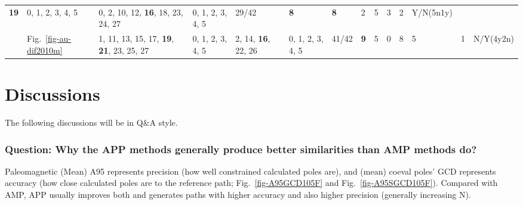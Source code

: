 \begin{table*}
{\begin{tabular}{l|l|l|l|l|l|l|l|l|l|l|l|l|l}
{{  \textbf{19}}} & \multirow{2}{*}{\parbox{1cm}{0, 1, 2, 3, 4, 5}} &
  \multirow{2}{*}{\parbox{2.4cm}{0, 2, 10, 12, \textbf{16}, 18, 23, 24, 27}} &
  \multirow{2}{*}{\parbox{1cm}{0, 1, 2, 3, 4, 5}} & 29/42 & \textbf{8} & \textbf{8} & 2 & 5 & 3
  & 2 & Y/N(5n1y) \\ \\ \cline{2-14}
& Fig.~\ref{fig-au-dif2010m} & \multirow{2}{*}{\parbox{2cm}{1, 11, 13, 15, 17,
  \textbf{19}, \textbf{21}, 23, 25, 27}} & \multirow{2}{*}{\parbox{1cm}{0, 1, 2, 3, 4, 5}} &
  \multirow{2}{*}{\parbox{2cm}{2, 14, \textbf{16}, 22, 26}} &
  \multirow{2}{*}{\parbox{1cm}{0, 1, 2, 3, 4, 5}} & 41/42 & \textbf{9} & 5 & 0 & 8 & 5
  & 1 & N/Y(4y2n)
\end{tabular}%
}
\end{table*}

\section{Discussions}

The following discussions will be in Q\&A style.

\subsubsection{Question: Why the APP methods generally produce better
similarities than AMP methods do?}

Paleomagnetic (Mean) A95 represents precision (how well constrained calculated
poles are), and (mean) coeval poles' GCD represents accuracy (how close
calculated poles are to the reference path; Fig.~\ref{fig-A95GCD105F} and
Fig.~\ref{fig-A95SGCD105F}). Compared with AMP, APP usually improves both and
generates paths with higher accuracy and also higher precision (generally
increasing N).

